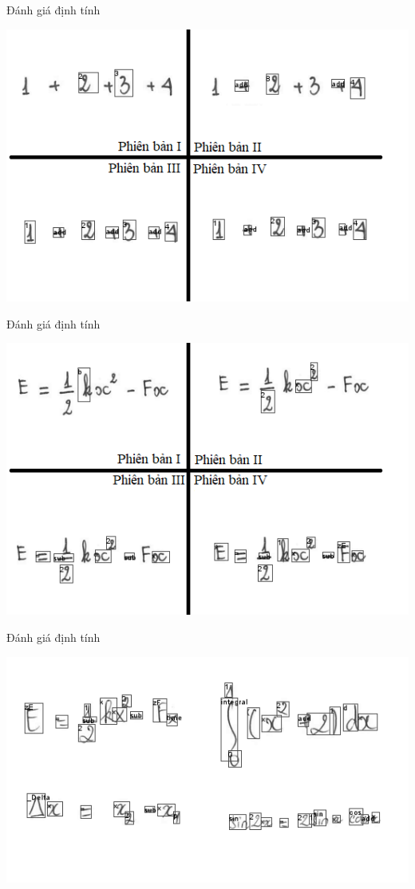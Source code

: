 \documentclass{beamer}
\begin{document}
	\begin{frame}{Đánh giá định tính}
		\begin{center}
			\centering
			\includegraphics[width=0.775\linewidth]{compare_4.png}
			\vspace{0.5cm}
		\end{center}
	\end{frame}
	\begin{frame}{Đánh giá định tính}
	\begin{center}
		\centering
		\includegraphics[width=0.775\linewidth]{compare_1.png}
		\vspace{0.5cm}
	\end{center}
	\end{frame}
	\begin{frame}{Đánh giá định tính}
	\begin{center}
		\centering
		\includegraphics[width=0.85\linewidth]{compare_7.png}
		\vspace{0.5cm}
	\end{center}
	\end{frame}
\end{document}
